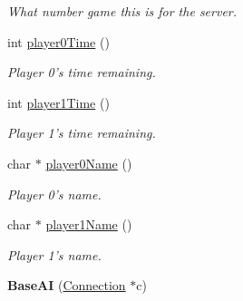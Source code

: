 \begin{DoxyCompactItemize}
\begin{DoxyCompactList}\small\item\em What number game this is for the server. \item\end{DoxyCompactList}\item 
\hypertarget{classBaseAI_a0c98c065f57b1519d6daf72ef1c71d71}{
int \hyperlink{classBaseAI_a0c98c065f57b1519d6daf72ef1c71d71}{player0Time} ()}
\label{classBaseAI_a0c98c065f57b1519d6daf72ef1c71d71}

\begin{DoxyCompactList}\small\item\em Player 0's time remaining. \item\end{DoxyCompactList}\item 
\hypertarget{classBaseAI_a5a96b2451bf0e2f6567e9e56d59cf7cb}{
int \hyperlink{classBaseAI_a5a96b2451bf0e2f6567e9e56d59cf7cb}{player1Time} ()}
\label{classBaseAI_a5a96b2451bf0e2f6567e9e56d59cf7cb}

\begin{DoxyCompactList}\small\item\em Player 1's time remaining. \item\end{DoxyCompactList}\item 
\hypertarget{classBaseAI_a92f2bd6e6d2acdab0a3d5749fc6d6ca8}{
char $\ast$ \hyperlink{classBaseAI_a92f2bd6e6d2acdab0a3d5749fc6d6ca8}{player0Name} ()}
\label{classBaseAI_a92f2bd6e6d2acdab0a3d5749fc6d6ca8}

\begin{DoxyCompactList}\small\item\em Player 0's name. \item\end{DoxyCompactList}\item 
\hypertarget{classBaseAI_a806ae8a1459d856a4b66e493a54a1b9a}{
char $\ast$ \hyperlink{classBaseAI_a806ae8a1459d856a4b66e493a54a1b9a}{player1Name} ()}
\label{classBaseAI_a806ae8a1459d856a4b66e493a54a1b9a}

\begin{DoxyCompactList}\small\item\em Player 1's name. \item\end{DoxyCompactList}\item 
\hypertarget{classBaseAI_a3f2806936e6e65d76218e04b057e05f4}{
{\bfseries BaseAI} (\hyperlink{structConnection}{Connection} $\ast$c)}
\label{classBaseAI_a3f2806936e6e65d76218e04b057e05f4}


\end{DoxyCompactItemize}
